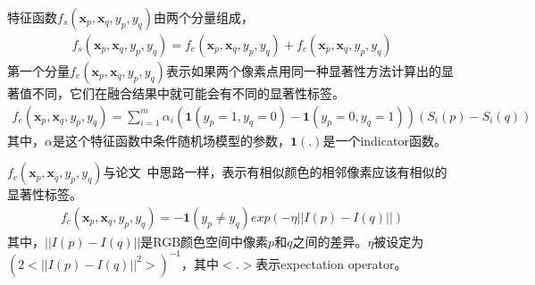 \documentclass[12pt]{article}
\begin{document}
特征函数$f_s(\textbf{x}_p, \textbf{x}_q, y_p, y_q)$由两个分量组成，
\begin{align}
f_s(\textbf{x}_p, \textbf{x}_q, y_p, y_q) = f_e(\textbf{x}_p, \textbf{x}_q, y_p, y_q)+f_c(\textbf{x}_p, \textbf{x}_q, y_p, y_q)
\end{align}
第一个分量$f_e(\textbf{x}_p, \textbf{x}_q, y_p, y_q)$表示如果两个像素点用同一种显著性方法计算出的显著值不同，它们在融合结果中就可能会有不同的显著性标签。
\begin{align}
f_e(\textbf{x}_p, \textbf{x}_q, y_p, y_q) = \sum_{i=1}^{m}\alpha_i(\textbf{1}(y_p=1, y_q=0)-\textbf{1}(y_p=0, y_q=1))(S_i(p)-S_i(q))
\end{align}
其中，$\alpha$是这个特征函数中条件随机场模型的参数，$\textbf{1}(.)$是一个indicator函数。

$f_c(\textbf{x}_p, \textbf{x}_q, y_p, y_q)$与论文~\cite{liu2011learning}中思路一样，表示有相似颜色的相邻像素应该有相似的显著性标签。
\begin{align}
f_c(\textbf{x}_p, \textbf{x}_q, y_p, y_q) = -\textbf{1}(y_p\ne y_q)exp(-\eta||I(p)-I(q)||)
\end{align}
其中，$||I(p)-I(q)||$是RGB颜色空间中像素$p$和$q$之间的差异。$\eta$被设定为$(2< ||I(p)-I(q)||^2>)^{-1}$，其中$< . >$表示expectation operator。




%


\end{document}
